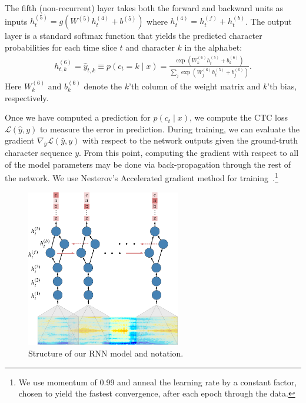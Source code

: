 The fifth (non-recurrent) layer takes both the forward and backward units as
inputs $h^{(5)}_t = g(W^{(5)} h^{(4)}_t + b^{(5)})$ where $h^{(4)}_t =
h^{(f)}_t + h^{(b)}_t$. The output layer is a standard softmax function that
yields the predicted character probabilities for each time slice $t$ and
character $k$ in the alphabet:
\begin{align*}
    h_{t,k}^{(6)} = \hat{y}_{t,k} \equiv p(c_t = k \mid x) =
        \frac{\exp(W_k^{(6)} h_t^{(5)}+b_k^{(6)})}{\sum_j \exp(W_j^{(6)} h_t^{(5)}+b_j^{(6)})}.
\end{align*}
Here $W_k^{(6)}$ and $b_k^{(6)}$ denote the $k$'th column of the weight matrix
and $k$'th bias, respectively.  

Once we have computed a prediction for $p(c_t \mid x)$, we compute the CTC
loss~\cite{graves2006} $\mathcal{L}(\hat{y}, y)$ to measure the error in
prediction. During training, we can evaluate the gradient $\nabla_{\hat{y}}
\mathcal{L}(\hat{y}, y)$ with respect to the network outputs given the
ground-truth character sequence $y$. From this point, computing the gradient
with respect to all of the model parameters may be done via back-propagation
through the rest of the network. We use Nesterov's Accelerated gradient method
for training~\cite{sutskever2013}.\footnote{We use momentum of 0.99 and
anneal the learning rate by a constant factor, chosen to yield the fastest
convergence, after each epoch through the data.}

\begin{figure}[th]
\centering
 \includegraphics[width=0.6\textwidth]{deepspeech/figures/speech_network.pdf}
  \caption{Structure of our RNN model and notation.}
  \label{fig:deepspeech:rnn}
\end{figure}

